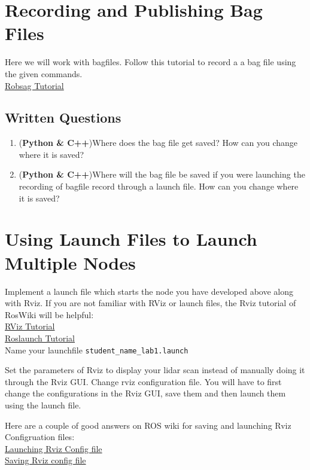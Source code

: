 \documentclass[letta4 paper]{article}
\numberwithin{equation}{section}
\newcommand{\0}{\mathbf{0}}
\begin{document}
	\section{Recording and Publishing Bag Files}
	Here we will work with bagfiles. Follow this tutorial to record a a bag file using the given commands. \\
	\href{http://wiki.ros.org/ROS/Tutorials/Recording%20and%20playing%20back%20data}{Robsag Tutorial}\\

	\subsection{Written Questions}
	\begin{enumerate}
		\item (\textbf{Python \& C++})Where does the bag file get saved? How can you change where it is saved? 
		\item (\textbf{Python \& C++})Where will the bag file be saved if you were launching the recording of bagfile record through a launch file. How can you change where it is saved?
	\end{enumerate}{}


	\section{Using Launch Files to Launch Multiple Nodes}
	Implement a launch file which starts the node you have developed above along with Rviz. If you are not familiar with RViz or launch files, the Rviz tutorial of RosWiki will be helpful:  \\
	\href{http://wiki.ros.org/rviz/Tutorials}{RViz Tutorial}\\
	\href{http://wiki.ros.org/roslaunch}{Roslaunch Tutorial}\\
	\noindent Name your launchfile \texttt{student\_name\_lab1.launch}
	
	Set the parameters of Rviz to display your lidar scan instead of manually doing it through the Rviz GUI. Change rviz configuration file. You will have to first change the configurations in the Rviz GUI, save them and then launch them using the launch file.
	
	Here are a couple of good answers on ROS wiki for saving and launching Rviz Configruation files: \\
	\href{https://answers.ros.org/question/287670/run-rviz-with-configuration-file-from-launch-file/}{Launching Rviz Config file}\\
	\href{https://answers.ros.org/question/11845/rviz-configuration-file-format/}{Saving Rviz config file}\\
\end{document}
